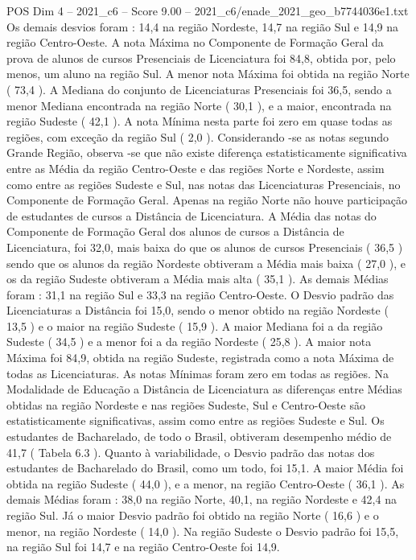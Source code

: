 \begin{textsample}{POS Dim 4 – 2021\_c6 – Score 9.00 – 2021\_c6/enade\_2021\_geo\_b7744036e1.txt}
Os demais desvios foram : 14,4 na região Nordeste, 14,7 na região Sul e 14,9 na região Centro-Oeste.
A nota Máxima no Componente de Formação Geral da prova de alunos de cursos Presenciais de Licenciatura foi 84,8, obtida por, pelo menos, um aluno na região Sul.
A menor nota Máxima foi obtida na região Norte ( 73,4 ).
A Mediana do conjunto de Licenciaturas Presenciais foi 36,5, sendo a menor Mediana encontrada na região Norte ( 30,1 ), e a maior, encontrada na região Sudeste ( 42,1 ).
A nota Mínima nesta parte foi zero em quase todas as regiões, com exceção da região Sul ( 2,0 ).
Considerando -se as notas segundo Grande Região, observa -se que não existe diferença estatisticamente significativa entre as Média da região Centro-Oeste e das regiões Norte e Nordeste, assim como entre as regiões Sudeste e Sul, nas notas das Licenciaturas Presenciais, no Componente de Formação Geral.
Apenas na região Norte não houve participação de estudantes de cursos a Distância de Licenciatura.
A Média das notas do Componente de Formação Geral dos alunos de cursos a Distância de Licenciatura, foi 32,0, mais baixa do que os alunos de cursos Presenciais ( 36,5 ) sendo que os alunos da região Nordeste obtiveram a Média mais baixa ( 27,0 ), e os da região Sudeste obtiveram a Média mais alta ( 35,1 ).
As demais Médias foram : 31,1 na região Sul e 33,3 na região Centro-Oeste.
O Desvio padrão das Licenciaturas a Distância foi 15,0, sendo o menor obtido na região Nordeste ( 13,5 ) e o maior na região Sudeste ( 15,9 ).
A maior Mediana foi a da região Sudeste ( 34,5 ) e a menor foi a da região Nordeste ( 25,8 ).
A maior nota Máxima foi 84,9, obtida na região Sudeste, registrada como a nota Máxima de todas as Licenciaturas.
As notas Mínimas foram zero em todas as regiões.
Na Modalidade de Educação a Distância de Licenciatura as diferenças entre Médias obtidas na região Nordeste e nas regiões Sudeste, Sul e Centro-Oeste são estatisticamente significativas, assim como entre as regiões Sudeste e Sul.
Os estudantes de Bacharelado, de todo o Brasil, obtiveram desempenho médio de 41,7 ( Tabela 6.3 ).
Quanto à variabilidade, o Desvio padrão das notas dos estudantes de Bacharelado do Brasil, como um todo, foi 15,1.
A maior Média foi obtida na região Sudeste ( 44,0 ), e a menor, na região Centro-Oeste ( 36,1 ).
As demais Médias foram : 38,0 na região Norte, 40,1, na região Nordeste e 42,4 na região Sul.
Já o maior Desvio padrão foi obtido na região Norte ( 16,6 ) e o menor, na região Nordeste ( 14,0 ).
Na região Sudeste o Desvio padrão foi 15,5, na região Sul foi 14,7 e na região Centro-Oeste foi 14,9.

\end{textsample}
